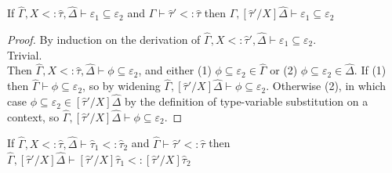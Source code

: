 \documentclass{llncs}
\begin{document}
\hrulefill

\begin{lemma}
If $\hat \Gamma, X <: \hat \tau, \hat \Delta \vdash \varepsilon_1 \subseteq \varepsilon_2$ and $\hat \Gamma \vdash \hat \tau' <: \hat \tau$ then $\hat \Gamma, [\hat \tau'/X]\hat \Delta \vdash \varepsilon_1 \subseteq \varepsilon_2$
\end{lemma}

\begin{proof} By induction on the derivation of $\hat \Gamma, X <: \hat \tau', \hat \Delta \vdash \varepsilon_1 \subseteq \varepsilon_2$.\\

 Trivial.\\

 Then $\hat \Gamma, X <: \hat \tau, \hat \Delta \vdash \phi \subseteq \varepsilon_2$, and either (1) $\phi \subseteq \varepsilon_2 \in \hat \Gamma$ or (2) $\phi \subseteq \varepsilon_2 \in \hat \Delta$. If (1) then $\hat \Gamma \vdash \phi \subseteq \varepsilon_2$, so by widening $\hat \Gamma, [\hat \tau'/X]\hat \Delta \vdash \phi \subseteq \varepsilon_2$. Otherwise (2), in which case $\phi \subseteq \varepsilon_2 \in [\hat \tau'/X]\hat \Delta$ by the definition of type-variable substitution on a context, so $\hat \Gamma, [\hat \tau'/X]\hat \Delta \vdash \phi \subseteq \varepsilon_2$.

\end{proof}

\hrulefill

\begin{lemma}
If $\hat \Gamma, X <: \hat \tau, \hat \Delta \vdash \hat \tau_1 <: \hat \tau_2$ and $\hat \Gamma \vdash \hat \tau' <: \hat \tau$ then $\hat \Gamma, [\hat \tau'/X]\hat \Delta \vdash [\hat \tau'/X]\hat \tau_1 <: [\hat \tau'/X]\hat \tau_2$
\end{lemma}
\end{document}
